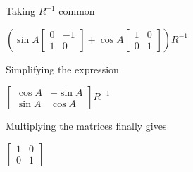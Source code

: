 \documentclass[journal,12pt,twocolumn]{IEEEtran}
\begin{document}
Taking $R^{ -1}$ common

\begin{center}
$\left (\sin A\left [\begin{array}{cc}0 &  -1 \\
1 & 0^{}\end{array}\right ] +\cos A\left [\begin{array}{cc}1 & 0 \\
0 & 1\end{array}\right ]\right )R^{ -1}$\newline
\end{center}\par

Simplifying the expression

\begin{center}
$\left [\begin{array}{cc}\cos A &  -\sin A \\
\sin A & \cos A\end{array}\right ]R^{ -1}$\linebreak\relax
\end{center}\par

Multiplying the matrices finally gives

\begin{center}
$\left [\begin{array}{cc}1 & 0 \\
0 & 1\end{array}\right ]$
\end{center}\par
\end{document}
